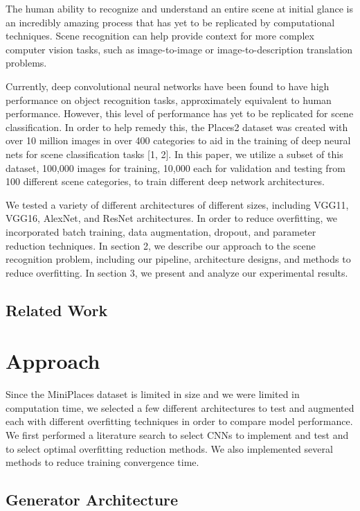 \documentclass[10pt,twocolumn,letterpaper]{article}
\begin{document}
The human ability to recognize and understand an entire scene at initial glance is an incredibly amazing process that has yet to be replicated by computational techniques. Scene recognition can help provide context for more complex computer vision tasks, such as image-to-image or image-to-description translation problems.

Currently, deep convolutional neural networks have been found to have high performance on object recognition tasks, approximately equivalent to human performance. However, this level of performance has yet to be replicated for scene classification. In order to help remedy this, the Places2 dataset was created with over 10 million images in over 400 categories to aid in the training of deep neural nets for scene classification tasks [1, 2]. In this paper, we utilize a subset of this dataset, 100,000 images for training, 10,000 each for validation and testing from 100 different scene categories, to train different deep network architectures. 

We tested a variety of different architectures of different sizes, including VGG11, VGG16, AlexNet, and ResNet architectures. In order to reduce overfitting, we incorporated batch training, data augmentation, dropout, and parameter reduction techniques. In section 2, we describe our approach to the scene recognition problem, including our pipeline, architecture designs, and methods to reduce overfitting. In section 3, we present and analyze our experimental results.

\subsection{Related Work}


\section{Approach}

Since the MiniPlaces dataset is limited in size and we were limited in computation time, we selected a few different architectures to test and augmented each with different overfitting techniques in order to compare model performance. We first performed a literature search to select CNNs to implement and test and to select optimal overfitting reduction methods. We also implemented several methods to reduce training convergence time.

\subsection{Generator Architecture}
\end{document}
